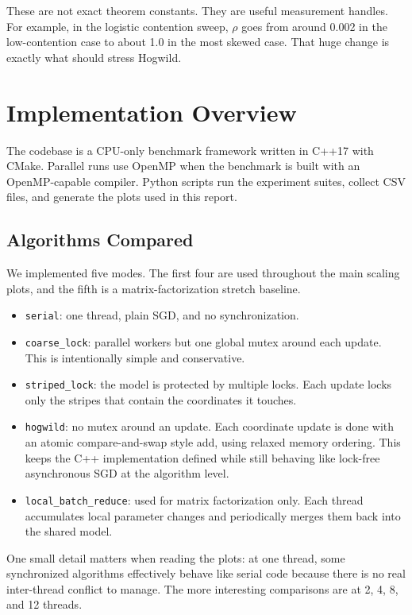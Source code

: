 \documentclass[11pt]{article}
\begin{document}
These are not exact theorem constants. They are useful measurement handles. For example, in the logistic contention sweep, \(\rho\) goes from around 0.002 in the low-contention case to about 1.0 in the most skewed case. That huge change is exactly what should stress Hogwild.

\section{Implementation Overview}

The codebase is a CPU-only benchmark framework written in C++17 with CMake. Parallel runs use OpenMP when the benchmark is built with an OpenMP-capable compiler. Python scripts run the experiment suites, collect CSV files, and generate the plots used in this report.

\subsection{Algorithms Compared}

We implemented five modes. The first four are used throughout the main scaling plots, and the fifth is a matrix-factorization stretch baseline.

\begin{itemize}
  \item \texttt{serial}: one thread, plain SGD, and no synchronization.
  \item \texttt{coarse\_lock}: parallel workers but one global mutex around each update. This is intentionally simple and conservative.
  \item \texttt{striped\_lock}: the model is protected by multiple locks. Each update locks only the stripes that contain the coordinates it touches.
  \item \texttt{hogwild}: no mutex around an update. Each coordinate update is done with an atomic compare-and-swap style add, using relaxed memory ordering. This keeps the C++ implementation defined while still behaving like lock-free asynchronous SGD at the algorithm level.
  \item \texttt{local\_batch\_reduce}: used for matrix factorization only. Each thread accumulates local parameter changes and periodically merges them back into the shared model.
\end{itemize}

One small detail matters when reading the plots: at one thread, some synchronized algorithms effectively behave like serial code because there is no real inter-thread conflict to manage. The more interesting comparisons are at 2, 4, 8, and 12 threads.
\end{document}
